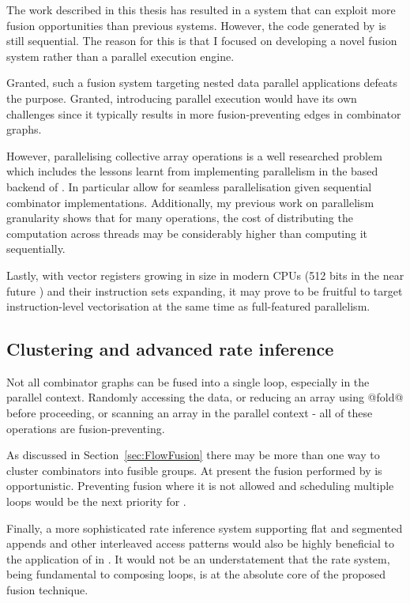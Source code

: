\documentclass[preamble.tex]{subfiles}
\begin{document}
The work described in this thesis has resulted in a system that can exploit more fusion opportunities than previous systems. However, the code generated by \LiveFusion is still sequential. The reason for this is that I focused on developing a novel fusion system rather than a parallel execution engine.

Granted, such a fusion system targeting nested data parallel applications defeats the purpose. Granted, introducing parallel execution would have its own challenges since it typically results in more fusion-preventing edges in combinator graphs.

However, parallelising collective array operations is a well researched problem which includes the lessons learnt from implementing parallelism in the \StreamFusion based backend of \DPH. In particular  \cite{CLP+07} allow for seamless parallelisation given sequential combinator implementations. Additionally, my previous work on parallelism granularity shows that for many operations, the cost of distributing the computation across threads may be considerably higher than computing it sequentially.

Lastly, with vector registers growing in size in modern CPUs (512 bits in the near future \cite{IntelISA}) and their instruction sets expanding, it may prove to be fruitful to target instruction-level vectorisation at the same time as full-featured parallelism.



\subsection{Clustering and advanced rate inference}

Not all combinator graphs can be fused into a single loop, especially in the parallel context. Randomly accessing the data, or reducing an array using @fold@ before proceeding, or scanning an array in the parallel context - all of these operations are fusion-preventing.

As discussed in Section~\ref{sec:FlowFusion} there may be more than one way to cluster combinators into fusible groups. At present the fusion performed by \LiveFusion is opportunistic. Preventing fusion where it is not allowed and scheduling multiple loops would be the next priority for \LiveFusion.

Finally, a more sophisticated rate inference system supporting flat and segmented appends and other interleaved access patterns would also be highly beneficial to the application of \LiveFusion in \DPH. It would not be an understatement that the rate system, being fundamental to composing loops, is at the absolute core of the proposed fusion technique.






\IfNotCompilingAll{\printbibliography}
\end{document}

